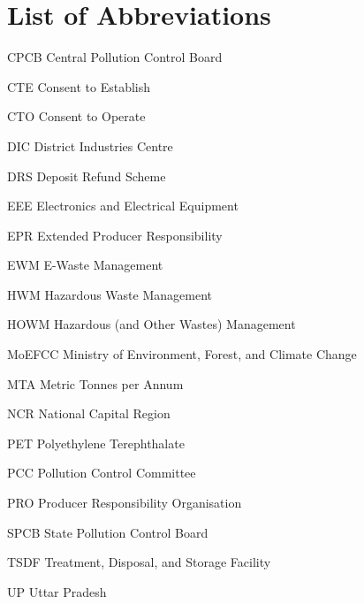 \documentclass[a4paper, 12pt]{article}
\begin{document}
        \section*{List of Abbreviations}
        
         
        \begin{abbrv}
         
        \item[CPCB]			Central Pollution Control Board
        \item[CTE]				Consent to Establish
        \item[CTO]			Consent to Operate
        \item[DIC]				District Industries Centre
        \item[DRS]			Deposit Refund Scheme
        \item[EEE]				Electronics and Electrical Equipment 
        \item[EPR]				Extended Producer Responsibility 
        \item[EWM]			E-Waste Management
        \item[HWM]			Hazardous Waste Management
        \item[HOWM]			Hazardous (and Other Wastes) Management
        \item[MoEFCC]			Ministry of Environment, Forest, and Climate Change
        \item[MTA]				Metric Tonnes per Annum
        \item[NCR]			National Capital Region
        \item[PET]				Polyethylene Terephthalate
        \item[PCC]			Pollution Control Committee
        \item[PRO]			Producer Responsibility Organisation
        \item[SPCB]			State Pollution Control Board
        \item[TSDF]			Treatment, Disposal, and Storage Facility
        \item[UP]				Uttar Pradesh
        
        
         
        \end{abbrv}
        
                    
                    \newpage
\end{document}
